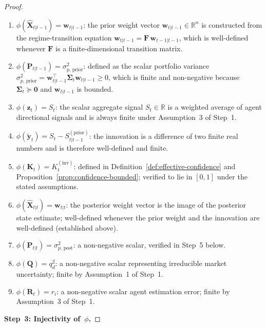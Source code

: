 \documentclass[12pt,openany]{book}
\numberwithin{equation}{chapter}
\theoremstyle{plain}
\theoremstyle{definition}
\theoremstyle{remark}
\begin{document}
\begin{proof}
\begin{enumerate}
  \item $\phi(\hat{\mathbf{X}}_{t|t-1}) = \mathbf{w}_{t|t-1}$:
        the prior weight vector $\mathbf{w}_{t|t-1} \in \mathbb{R}^n$
        is constructed from the regime-transition equation
        $\mathbf{w}_{t|t-1} = \mathbf{F}\,\mathbf{w}_{t-1|t-1}$,
        which is well-defined whenever $\mathbf{F}$ is a
        finite-dimensional transition matrix.
  \item $\phi(\mathbf{P}_{t|t-1}) = \sigma_{p,\,\text{prior}}^2$:
        defined as the scalar portfolio variance
        $\sigma_{p,\,\text{prior}}^2 =
        \mathbf{w}_{t|t-1}^\top \boldsymbol{\Sigma}_t
        \mathbf{w}_{t|t-1} \geq 0$, which is finite and
        non-negative because $\boldsymbol{\Sigma}_t \succcurlyeq
        \mathbf{0}$ and $\mathbf{w}_{t|t-1}$ is bounded.
  \item $\phi(\mathbf{z}_t) = S_t$: the scalar aggregate signal
        $S_t \in \mathbb{R}$ is a weighted average of agent
        directional signals and is always finite under
        Assumption~3 of Step~1.
  \item $\phi(\tilde{\mathbf{y}}_t)
        = S_t - S_{t|t-1}^{(\mathrm{prior})}$: the innovation
        is a difference of two finite real numbers and is
        therefore well-defined and finite.
  \item $\phi(\mathbf{K}_t) = K_t^{(\mathrm{inv})}$: defined in
        Definition~\ref{def:effective-confidence} and
        Proposition~\ref{prop:confidence-bounded}; verified to
        lie in $[0,1]$ under the stated assumptions.
  \item $\phi(\hat{\mathbf{X}}_{t|t}) = \mathbf{w}_{t|t}$: the
        posterior weight vector is the image of the posterior
        state estimate; well-defined whenever the prior weight
        and the innovation are well-defined (established above).
  \item $\phi(\mathbf{P}_{t|t}) = \sigma_{p,\,\text{post}}^2$:
        a non-negative scalar, verified in Step~5 below.
  \item $\phi(\mathbf{Q}) = q_d^2$: a non-negative scalar
        representing irreducible market uncertainty; finite by
        Assumption~1 of Step~1.
  \item $\phi(\mathbf{R}_t) = r_i$: a non-negative scalar agent
        estimation error; finite by Assumption~3 of Step~1.
\end{enumerate}

\medskip
\noindent\textbf{Step~3: Injectivity of~$\phi$.}


\end{proof}
\end{document}
